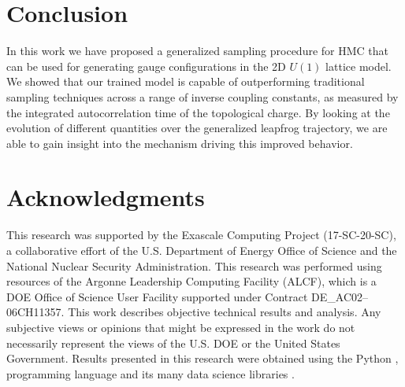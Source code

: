 \documentclass[a4paper,11pt]{article}
\begin{document}
\section{\label{sec:conclusion}Conclusion}
%
In this work we have proposed a generalized sampling procedure for HMC that can
be used for generating gauge configurations in the 2D \(U(1)\) lattice model.
%
We showed that our trained model is capable of outperforming traditional
sampling techniques across a range of inverse coupling constants, as measured
by the integrated autocorrelation time of the topological charge.
%
By looking at the evolution of different quantities over the generalized
leapfrog trajectory, we are able to gain insight into the mechanism driving
this improved behavior.
%
\section{\label{sec:ack}Acknowledgments}
%
This research was supported by the Exascale Computing Project (17-SC-20-SC), a
collaborative effort of the U.S. Department of Energy Office of Science and the
National Nuclear Security Administration.
%
This research was performed using resources of the Argonne Leadership Computing
Facility (ALCF), which is a DOE Office of Science User Facility supported under
Contract DE\_AC02--06CH11357. 
%
This work describes objective technical results and analysis.
%
Any subjective views or opinions that might be expressed in the work do not
necessarily represent the views of the U.S. DOE or the United States
Government.
%
Results presented in this research were obtained using the Python
\citep{van1995python}, programming language and its many data science libraries
\cite{%
    matplotlib,%
    harris2020array,%
    tensorflow2015-whitepaper,%
    ipython4160251%
}.
%



\end{document}
